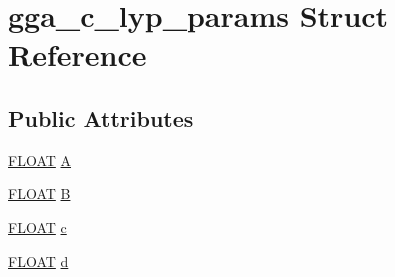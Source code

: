 \hypertarget{structgga__c__lyp__params}{\section{gga\-\_\-c\-\_\-lyp\-\_\-params Struct Reference}
\label{structgga__c__lyp__params}
}
\subsection*{Public Attributes}
\begin{DoxyCompactItemize}
\item 
\hyperlink{src_2xc__config_8h_ae8690abbffa85934d64d545920e2b108}{F\-L\-O\-A\-T} \hyperlink{structgga__c__lyp__params_a68dfbfdfe2ac77a3f7e7c05269cbce48}{A}
\item 
\hyperlink{src_2xc__config_8h_ae8690abbffa85934d64d545920e2b108}{F\-L\-O\-A\-T} \hyperlink{structgga__c__lyp__params_a1f3d609e41b6747c14faf4fe5301d158}{B}
\item 
\hyperlink{src_2xc__config_8h_ae8690abbffa85934d64d545920e2b108}{F\-L\-O\-A\-T} \hyperlink{structgga__c__lyp__params_a76d9898b63b2c62f70ba37ce8cbd5453}{c}
\item 
\hyperlink{src_2xc__config_8h_ae8690abbffa85934d64d545920e2b108}{F\-L\-O\-A\-T} \hyperlink{structgga__c__lyp__params_a9e843ac7fd3ab54269cddfc2b2340ce8}{d}
\end{DoxyCompactItemize}


